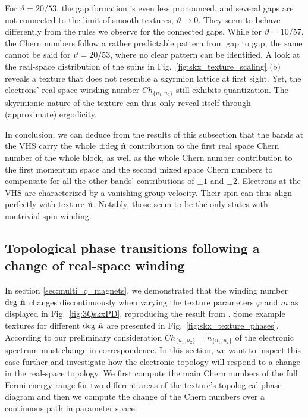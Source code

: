 \documentclass[submission, Phys]{SciPost}
\begin{document}
For $\vartheta=20/53$, the gap formation is even less pronounced, and several gaps are not connected to the limit of smooth textures, $\vartheta\to 0$.
They seem to behave differently from the rules we observe for the connected gaps. 
While for $\vartheta=10/57$, the Chern numbers follow a rather predictable pattern from gap to gap, the same cannot be said for $\vartheta=20/53$, where no clear pattern can be identified.
A look at the real-space distribution of the spins in Fig.~\ref{fig:skx_texture_scaling} (b) reveals a texture that does not resemble a skyrmion lattice at first sight. 
Yet, the electrons' real-space winding number $Ch_{\lbrace u_1,u_2 \rbrace }$ still exhibits quantization. 
The skyrmionic nature of the texture can thus only reveal itself through (approximate) ergodicity.

In conclusion, we can deduce from the results of this subsection that the bands at the VHS carry the whole $\pm \mathrm{deg}~\hat{\mathbf{n}}$ contribution to the first real space Chern number of the whole block, as well as the whole Chern number contribution to the first momentum space and the second mixed space Chern numbers to compensate for all the other bands' contributions of $\pm 1$ and $\pm2$.
Electrons at the VHS are characterized by a vanishing group velocity.
Their spin can thus align perfectly with texture $\hat{\mathbf{n}}$.
Notably, those seem to be the only states with nontrivial spin winding.


\subsection{Topological phase transitions following a change of real-space winding}

In section \ref{sec:multi_q_magnets}, we demonstrated that the winding number $\mathrm{deg}~\hat{\mathbf{n}}$ changes discontinuously when varying the texture parameters $\varphi$ and $m$ as displayed in Fig.~\ref{fig:3QskxPD}, reproducing the result from \cite{Shimizu2022}. Some example textures for different $\mathrm{deg}~\hat{\mathbf{n}}$ are presented in Fig.~\ref{fig:skx_texture_phases}.
According to our preliminary consideration $Ch_{\lbrace u_1, u_2 \rbrace }=n_{\lbrace u_1, u_2 \rbrace }$ of the electronic spectrum must change in correspondence.
In this section, we want to inspect this case further and investigate how the electronic topology will respond to a change in the real-space topology. 
We first compute the main Chern numbers of the full Fermi energy range for two different areas of the texture's topological phase diagram and then we compute the change of the Chern numbers over a continuous path in parameter space.
\end{document}
